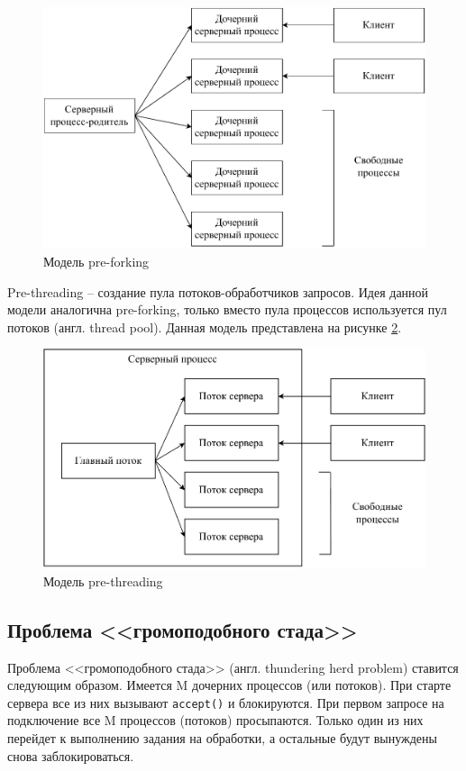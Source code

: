 \begin{figure}[ht]
	\centering
	\includegraphics[scale=0.8]{img/prefork.pdf}
	\caption{Модель pre-forking}
	\label{prefork}
\end{figure}
	
Pre-threading -- создание пула потоков-обработчиков запросов. Идея данной модели аналогична pre-forking, только вместо пула процессов используется пул потоков (англ. thread pool). Данная модель представлена на рисунке \ref{prethread}.

\begin{figure}[ht]
	\centering
	\includegraphics[scale=0.8]{img/prethread.pdf}
	\caption{Модель pre-threading}
	\label{prethread}
\end{figure}

\subsection{Проблема <<громоподобного стада>>}

Проблема <<громоподобного стада>> (англ. thundering herd problem) ставится следующим образом. Имеется M дочерних процессов (или потоков). При старте сервера все из них вызывают \texttt{accept()} и блокируются. При первом запросе на подключение все M процессов (потоков) просыпаются. Только один из них перейдет к выполнению задания на обработки, а остальные будут вынуждены снова заблокироваться.

